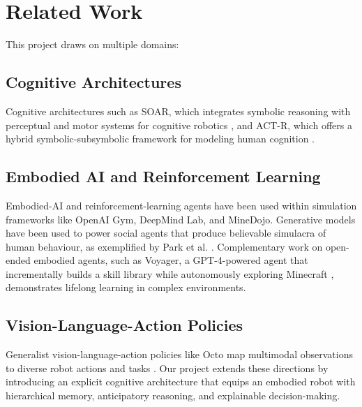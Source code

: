 \documentclass[../report.tex]{subfiles}
\begin{document}
    \section{Related Work}
    \label{sec:related_work}

    This project draws on multiple domains:

    \subsection{Cognitive Architectures}
    Cognitive architectures such as SOAR, which integrates symbolic reasoning with perceptual and motor systems for cognitive robotics \cite{soar}, and ACT-R, which offers a hybrid symbolic-subsymbolic framework for modeling human cognition \cite{actr}.

    \subsection{Embodied AI and Reinforcement Learning}
    Embodied-AI and reinforcement-learning agents have been used within simulation frameworks like OpenAI Gym, DeepMind Lab, and MineDojo. Generative models have been used to power social agents that produce believable simulacra of human behaviour, as exemplified by Park et al. \cite{generativeagents}. Complementary work on open-ended embodied agents, such as Voyager, a GPT-4-powered agent that incrementally builds a skill library while autonomously exploring Minecraft \cite{voyager}, demonstrates lifelong learning in complex environments.

    \subsection{Vision-Language-Action Policies}
    Generalist vision-language-action policies like Octo map multimodal observations to diverse robot actions and tasks \cite{octo}. Our project extends these directions by introducing an explicit cognitive architecture that equips an embodied robot with hierarchical memory, anticipatory reasoning, and explainable decision-making.
\end{document}
